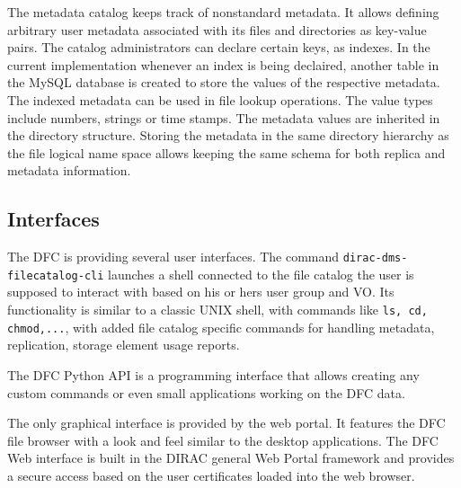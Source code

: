 The metadata catalog keeps track of nonstandard metadata. It allows defining arbitrary user metadata 
associated with its files and directories as key-value pairs. The catalog administrators can 
declare certain keys, as indexes. In the current implementation whenever an index is being declaired, 
another table in the MySQL database is created to store the values of the respective metadata. The indexed 
metadata can be used in file lookup operations. The value types include numbers, strings or time stamps. 
The metadata values are inherited in the directory structure. Storing the metadata in the same directory hierarchy 
as the file logical name space allows keeping the same schema for both replica and metadata information.

\subsection{Interfaces}

The DFC is providing several user interfaces. The command \texttt{dirac-dms-filecatalog-cli} launches a shell
connected to the file catalog the user is supposed to interact with based on his or hers user group and VO. Its 
functionality is similar to a classic UNIX shell, with commands like \texttt{ls, cd, chmod,...}, with added 
file catalog specific commands for handling metadata, replication, storage element usage reports.

The DFC Python API is a programming interface that allows creating any custom commands or even
small applications working on the DFC data.

The only graphical interface is provided by the web portal. It features the DFC file browser
with a look and feel similar to the desktop applications. The DFC Web interface is built in the DIRAC 
general Web Portal framework and provides a secure access based on the user certificates loaded into 
the web browser.